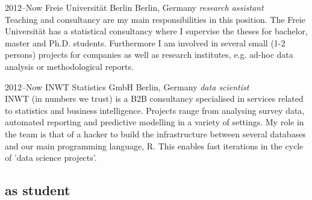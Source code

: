 \documentclass[]{friggeri-cv} %
\begin{document}
\begin{entrylist}


\entry
{2012--Now}
{Freie Universit\"at Berlin}
{Berlin, Germany}
{\emph{research assistant} \\
Teaching and consultancy are my main responsibilities in this position. The Freie Universit\"at has a statistical consultancy where I supervise the theses for bachelor, master and Ph.D. students. Furthermore I am involved in several small (1-2 persons) projects for companies as well as research institutes, e.g. ad-hoc data analysis or methodological reports.}


\entry
{2012--Now}
{INWT Statistics GmbH}
{Berlin, Germany}
{\emph{data scientist} \\ 
INWT (in numbers we trust) is a B2B consultancy specialised in services related to statistics and business intelligence. Projects range from analysing survey data, automated reporting and predictive modelling in a variety of settings. My role in the team is that of a hacker to build the infrastructure between several databases and our main programming language, R. This enables fast iterations in the cycle of 'data science projects'.
}


\end{entrylist}


\subsection{as student}
\end{document}
